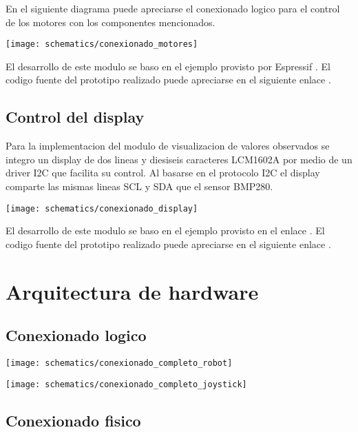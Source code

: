 En el siguiente diagrama puede apreciarse el conexionado logico para el control de los motores con los componentes mencionados.

\begin{center}
  \texttt{[image: schematics/conexionado\_motores]}
    \label{fig:conexionado_motores}
\end{center}

El desarrollo de este modulo se baso en el ejemplo provisto por Espressif \cite{ESP32_MCPWM_example}. El codigo fuente del prototipo realizado puede apreciarse en el siguiente enlace \cite{ESP32_POC_motor_MCPWM}.



\subsection{Control del display}

Para la implementacion del modulo de visualizacion de valores observados se integro un display de dos lineas y diesiseis caracteres LCM1602A por medio de un driver I2C que facilita su control. Al basarse en el protocolo I2C el display comparte las mismas lineas SCL y SDA que el sensor BMP280. 

\begin{center}
  \texttt{[image: schematics/conexionado\_display]}
    \label{fig:conexionado_display}

\end{center}


El desarrollo de este modulo se baso en el ejemplo provisto en el enlace \cite{ESP32_Display_Example}. El codigo fuente del prototipo realizado puede apreciarse en el siguiente enlace \cite{ESP32_POC_display}.


\section{Arquitectura de hardware}


\subsection{Conexionado logico }


\begin{center}
  \texttt{[image: schematics/conexionado\_completo\_robot]}
    \label{fig:conexionado_completo_robot}
\end{center}


\begin{center}
  \texttt{[image: schematics/conexionado\_completo\_joystick]}
    \label{fig:conexionado_completo_joystick}
\end{center}


\subsection{Conexionado fisico }



